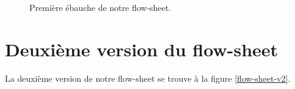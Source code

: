 \begin{figure}[htb!]
	\centering
	\caption{Première ébauche de notre flow-sheet.}
	\label{flow-sheet}
\end{figure}
\newpage

\section{Deuxième version du flow-sheet}
\label{appendix:flow-sheet}
La deuxième version de notre flow-sheet se trouve à la figure \ref{flow-sheet-v2}.

